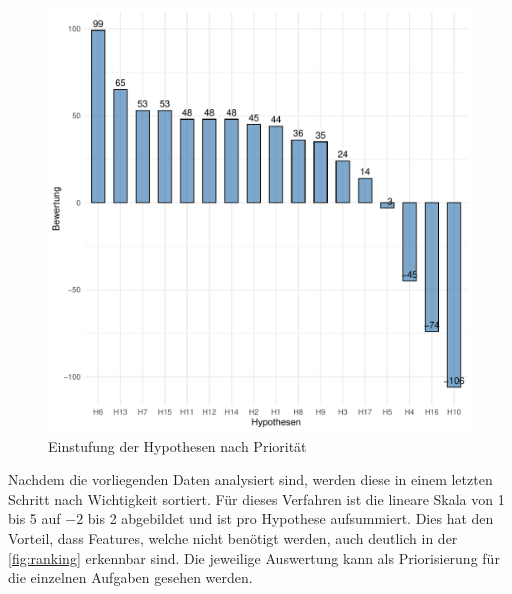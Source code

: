 \begin{figure}[H]
  \centering
  \includegraphics[width=0.8\columnwidth]{figures/plots/ranking.pdf}
  \caption{\label{fig:ranking} Einstufung der Hypothesen nach Priorität}
\end{figure}

Nachdem die vorliegenden Daten analysiert sind, werden diese in einem letzten Schritt nach Wichtigkeit sortiert.
Für dieses Verfahren ist die lineare Skala von 1 bis 5 auf $-2$ bis 2 abgebildet und ist pro Hypothese aufsummiert.
Dies hat den Vorteil, dass Features, welche nicht benötigt werden, auch deutlich in der \autoref{fig:ranking} erkennbar sind.
Die jeweilige Auswertung kann als Priorisierung für die einzelnen Aufgaben gesehen werden.
